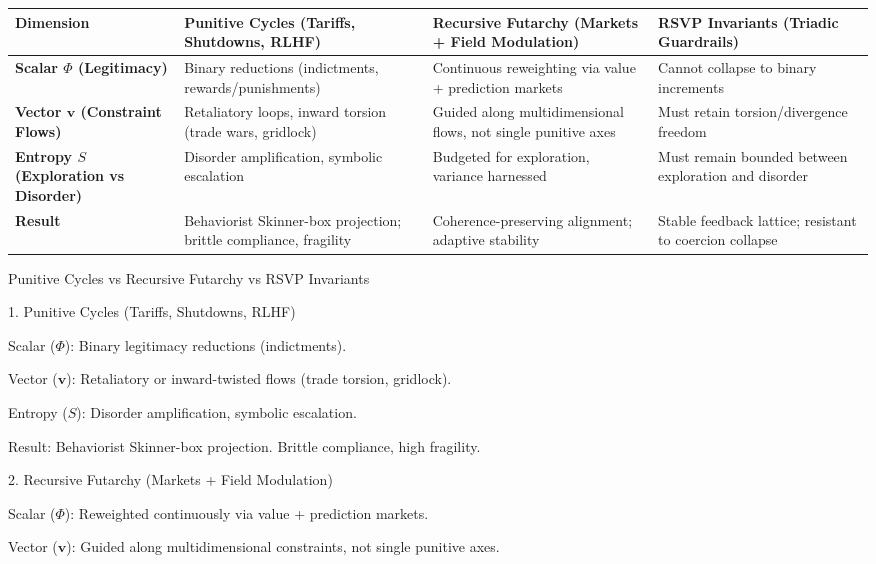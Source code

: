 \documentclass{article}
\begin{document}
\begin{tcolorbox}[cheatbox, title={Field-Theoretic Cheat Sheet: Punitive Cycles vs Recursive Futarchy vs RSVP Invariants}]
\begin{tabularx}{\textwidth}{|l|X|X|X|}
\hline
\textbf{Dimension} & \textbf{Punitive Cycles} (Tariffs, Shutdowns, RLHF) & \textbf{Recursive Futarchy} (Markets + Field Modulation) & \textbf{RSVP Invariants} (Triadic Guardrails) \\
\hline
\textbf{Scalar $\Phi$ \\ (Legitimacy)} & Binary reductions (indictments, rewards/punishments) & Continuous reweighting via value + prediction markets & Cannot collapse to binary increments \\
\hline
\textbf{Vector $\mathbf{v}$ \\ (Constraint Flows)} & Retaliatory loops, inward torsion (trade wars, gridlock) & Guided along multidimensional flows, not single punitive axes & Must retain torsion/divergence freedom \\
\hline
\textbf{Entropy $S$ \\ (Exploration vs Disorder)} & Disorder amplification, symbolic escalation & Budgeted for exploration, variance harnessed & Must remain bounded between exploration and disorder \\
\hline
\textbf{Result} & Behaviorist Skinner-box projection; brittle compliance, fragility & Coherence-preserving alignment; adaptive stability & Stable feedback lattice; resistant to coercion collapse \\
\hline
\end{tabularx}
\end{tcolorbox}

Punitive Cycles vs Recursive Futarchy vs RSVP Invariants

1. Punitive Cycles (Tariffs, Shutdowns, RLHF)

Scalar ($\Phi$): Binary legitimacy reductions (indictments).

Vector ($\mathbf{v}$): Retaliatory or inward-twisted flows (trade torsion, gridlock).

Entropy ($S$): Disorder amplification, symbolic escalation.

Result: Behaviorist Skinner-box projection. Brittle compliance, high fragility.


2. Recursive Futarchy (Markets + Field Modulation)

Scalar ($\Phi$): Reweighted continuously via value + prediction markets.

Vector ($\mathbf{v}$): Guided along multidimensional constraints, not single punitive axes.
\end{document}

